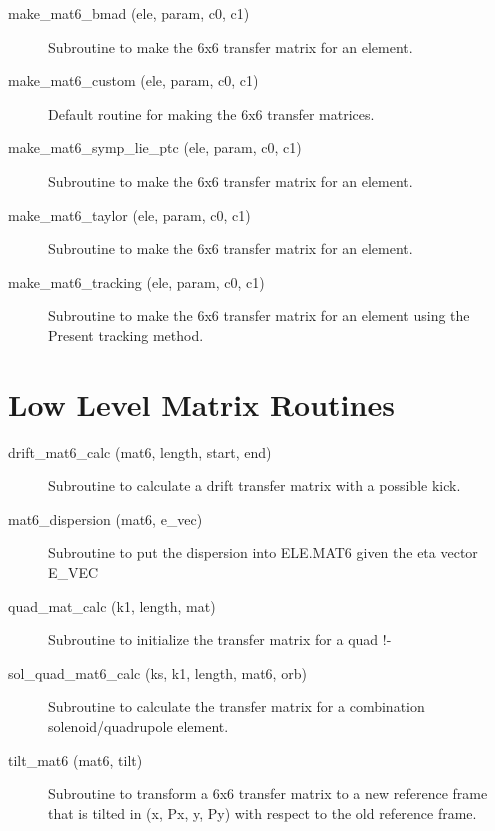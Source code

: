 \begin{description}

\item[make\_mat6\_bmad (ele, param, c0, c1)] \Newline
Subroutine to make the 6x6 transfer matrix for an element. 

\item[make\_mat6\_custom (ele, param, c0, c1)] \Newline
Default routine for making the 6x6 transfer matrices.

\item[make\_mat6\_symp\_lie\_ptc (ele, param, c0, c1)] \Newline
Subroutine to make the 6x6 transfer matrix for an element. 

\item[make\_mat6\_taylor (ele, param, c0, c1)] \Newline
Subroutine to make the 6x6 transfer matrix for an element. 

\item[make\_mat6\_tracking (ele, param, c0, c1)] \Newline
Subroutine to make the 6x6 transfer matrix for an element using the Present tracking method. 

\end{description}

\section{Low Level Matrix Routines}
\label{r:low_mat}  

\begin{description}

\item[drift\_mat6\_calc (mat6, length, start, end)] \Newline
Subroutine to calculate a drift transfer matrix with a possible kick. 

\item[mat6\_dispersion (mat6, e\_vec)] \Newline
Subroutine to put the dispersion into ELE.MAT6 given the eta vector E\_VEC 

\item[quad\_mat\_calc (k1, length, mat)] \Newline
Subroutine to initialize the transfer matrix for a quad !- 

\item[sol\_quad\_mat6\_calc (ks, k1, length, mat6, orb)] \Newline
Subroutine to calculate the transfer matrix for a combination solenoid/quadrupole element. 

\item[tilt\_mat6 (mat6, tilt)] \Newline
Subroutine to transform a 6x6 transfer matrix to a new reference frame that is 
tilted in (x, Px, y, Py) with respect to the old reference frame. 

\end{description}


